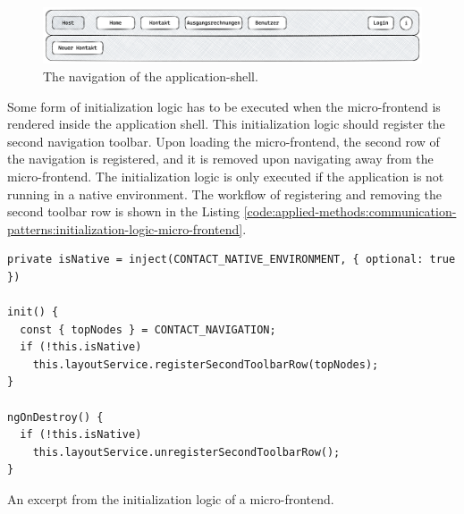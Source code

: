 \ifshowImages
  \begin{figure}[H]
  \centering
  \includegraphics[width=1\linewidth]{images/applied-methods/communication-patterns/host-contact-header.png}
  \caption{The navigation of the application-shell.}\label{fig:applied-methods:communication-patterns:application-shell-header}
  \end{figure}
\fi

\noindent Some form of initialization logic has to be executed when the micro-frontend is rendered inside the application shell. This initialization logic should register the second navigation toolbar. Upon loading the micro-frontend, the second row of the navigation is registered, and it is removed upon navigating away from the micro-frontend. The initialization logic is only executed if the application is not running in a native environment. The workflow of registering and removing the second toolbar row is shown in the Listing \ref{code:applied-methods:communication-patterns:initialization-logic-micro-frontend}.

\ifshowListings
  \begin{listing}[H]
  \begin{verbatim}
private isNative = inject(CONTACT_NATIVE_ENVIRONMENT, { optional: true })

init() {
  const { topNodes } = CONTACT_NAVIGATION;
  if (!this.isNative)
    this.layoutService.registerSecondToolbarRow(topNodes);
}

ngOnDestroy() {
  if (!this.isNative)
    this.layoutService.unregisterSecondToolbarRow();
}
  \end{verbatim}
  \caption{An excerpt from the initialization logic of a micro-frontend.}\label{code:applied-methods:communication-patterns:initialization-logic-micro-frontend}
  \end{listing}
\fi

